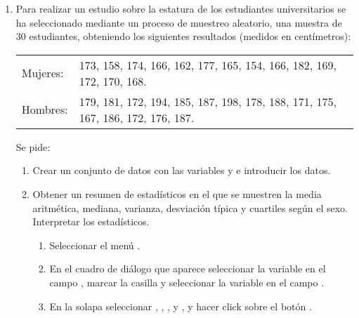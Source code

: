 \begin{enumerate}[leftmargin=*]
\item Para realizar un estudio sobre la estatura de los estudiantes universitarios se ha seleccionado mediante un
proceso de muestreo aleatorio, una muestra de 30 estudiantes, obteniendo los siguientes resultados (medidos en centímetros):
\begin{center}
\begin{tabular}{ll}
Mujeres: & 173, 158, 174, 166, 162, 177, 165, 154, 166, 182, 169, 172, 170, 168. \\
Hombres: & 179, 181, 172, 194, 185, 187, 198, 178, 188, 171, 175, 167, 186, 172, 176, 187. 
\end{tabular}
\end{center}
Se pide:

\begin{enumerate}
\item Crear un conjunto de datos con las variables  y  e introducir los datos.

\item Obtener un resumen de estadísticos en el que se muestren la media aritmética, mediana, varianza,
desviación típica y cuartiles según el sexo. Interpretar los estadísticos.
\begin{indicacion}
\begin{enumerate}
\item Seleccionar el menú .
\item En el cuadro de diálogo que aparece seleccionar la variable  en el campo ,
marcar la casilla  y seleccionar la variable  en el campo .
\item En la solapa  seleccionar , , ,
 y , y hacer click sobre el botón .
\end{enumerate}
\end{indicacion}
\end{enumerate}

\end{enumerate}


